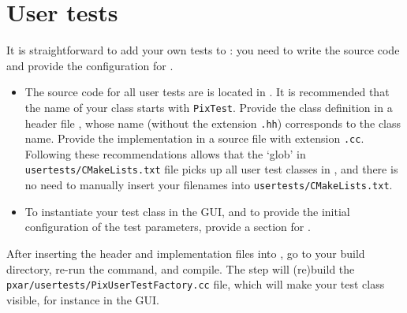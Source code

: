 \section{User tests}
\label{s:usertests}
It is straightforward to add your own tests to \pxar: you need to
write the source code and provide the configuration for
\testparameters. 
\begin{itemize}
\item The source code for all user tests are is located in
  \usertests. It is recommended that the name of your class starts
  with {\tt PixTest}. Provide the class definition in a header file ,
  whose name (without the extension {\tt .hh}) corresponds to the
  class name. Provide the implementation in a source file with
  extension {\tt .cc}. Following these recommendations allows that the
  `glob' in {\tt usertests/CMakeLists.txt} file picks up all user test classes in
  \usertests, and there is no need to manually insert your filenames
  into {\tt usertests/CMakeLists.txt}. 
\item To instantiate your test class in the GUI, and to provide the
  initial configuration of the test parameters, provide a section for
  \testparameters. 
\end{itemize}
After inserting the header and implementation files into \usertests,
go to your build directory, re-run the \cmake command, and
compile. The \cmake step will (re)build the {\tt
  pxar/usertests/PixUserTestFactory.cc} file, which will make your
test class visible, for instance in the GUI.
